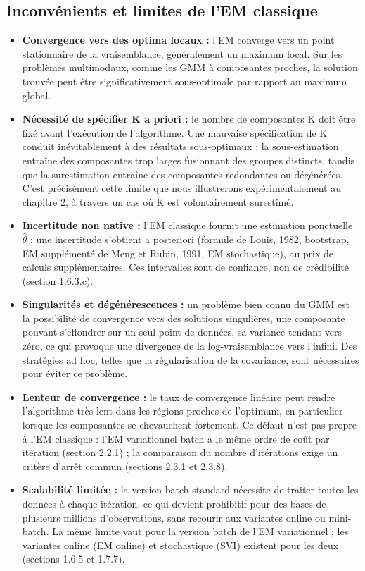\subsection{Inconvénients et limites de l'EM classique}
\begin{itemize}
\item \textbf{Convergence vers des optima locaux : }l'EM converge vers un point stationnaire de la vraisemblance, généralement un maximum local. Sur les problèmes multimodaux, comme les GMM à composantes proches, la solution trouvée peut être significativement sous-optimale par rapport au maximum global.
\item \textbf{Nécessité de spécifier K a priori : }le nombre de composantes K doit être fixé avant l'exécution de l'algorithme. Une mauvaise spécification de K conduit inévitablement à des résultats sous-optimaux : la sous-estimation entraîne des composantes trop larges fusionnant des groupes distincts, tandis que la surestimation entraîne des composantes redondantes ou dégénérées. C'est précisément cette limite que nous illustrerons expérimentalement au chapitre 2, à travers un cas où K est volontairement surestimé.
\item \textbf{Incertitude non native : }l'EM classique fournit une estimation ponctuelle $\hat{\theta}$ ; une incertitude s'obtient a posteriori (formule de Louis, 1982, bootstrap, EM supplémenté de Meng et Rubin, 1991, EM stochastique), au prix de calculs supplémentaires. Ces intervalles sont de confiance, non de crédibilité (section 1.6.3.c).
\item \textbf{Singularités et dégénérescences : }un problème bien connu du GMM est la possibilité de convergence vers des solutions singulières, une composante pouvant s'effondrer sur un seul point de données, sa variance tendant vers zéro, ce qui provoque une divergence de la log-vraisemblance vers l'infini. Des stratégies ad hoc, telles que la régularisation de la covariance, sont nécessaires pour éviter ce problème.
\item \textbf{Lenteur de convergence : }le taux de convergence linéaire peut rendre l'algorithme très lent dans les régions proches de l'optimum, en particulier lorsque les composantes se chevauchent fortement. Ce défaut n'est pas propre à l'EM classique : l'EM variationnel batch a le même ordre de coût par itération (section 2.2.1) ; la comparaison du nombre d'itérations exige un critère d'arrêt commun (sections 2.3.1 et 2.3.8).
\item \textbf{Scalabilité limitée : }la version batch standard nécessite de traiter toutes les données à chaque itération, ce qui devient prohibitif pour des bases de plusieurs millions d'observations, sans recourir aux variantes online ou mini-batch. La même limite vaut pour la version batch de l'EM variationnel ; les variantes online (EM online) et stochastique (SVI) existent pour les deux (sections 1.6.5 et 1.7.7).
\end{itemize}
